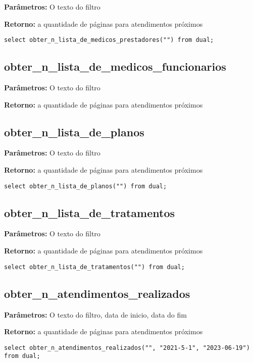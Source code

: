 \textbf{Parâmetros:} O texto do filtro

\textbf{Retorno:} a quantidade de páginas para atendimentos próximos

\begin{verbatim}
select obter_n_lista_de_medicos_prestadores("") from dual;
\end{verbatim}

\subsection{obter\_n\_lista\_de\_medicos\_funcionarios}

\textbf{Parâmetros:} O texto do filtro

\textbf{Retorno:} a quantidade de páginas para atendimentos próximos

\subsection{obter\_n\_lista\_de\_planos}

\textbf{Parâmetros:} O texto do filtro

\textbf{Retorno:} a quantidade de páginas para atendimentos próximos

\begin{verbatim}
select obter_n_lista_de_planos("") from dual;
\end{verbatim}

\subsection{obter\_n\_lista\_de\_tratamentos}

\textbf{Parâmetros:} O texto do filtro

\textbf{Retorno:} a quantidade de páginas para atendimentos próximos

\begin{verbatim}
select obter_n_lista_de_tratamentos("") from dual;
\end{verbatim}

\subsection{obter\_n\_atendimentos\_realizados}

\textbf{Parâmetros:} O texto do filtro, data de inicio, data do fim

\textbf{Retorno:} a quantidade de páginas para atendimentos próximos

\begin{verbatim}
select obter_n_atendimentos_realizados("", "2021-5-1", "2023-06-19") from dual;
\end{verbatim}

